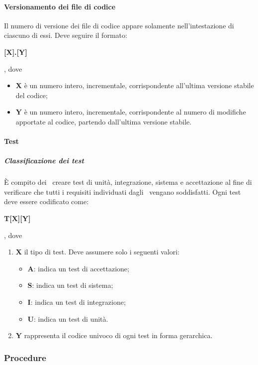 \documentclass[../NormeProgetto.tex]{subfiles}
\begin{document}
				\paragraph{Versionamento dei file di codice}
					Il numero di versione dei file di codice appare solamente nell'intestazione di ciascuno di essi. Deve seguire il formato:
					\begin{center}\textbf{[X].[Y]}\end{center}, dove
					\begin{itemize}
						\item \textbf{X} è un numero intero, incrementale, corrispondente all'ultima versione stabile del codice;
						\item \textbf{Y} è un numero intero, incrementale, corrispondente al numero di modifiche apportate al codice, partendo dall'ultima versione stabile.
					\end{itemize}
					
				\paragraph{Test}
					\subparagraph{Classificazione dei test}
					È compito dei \progettisti\ creare test di unità, integrazione, sistema e accettazione al fine di verificare che tutti i requisiti individuati dagli \analisti\ vengano soddisfatti. Ogni test deve essere codificato come:
					\begin{center}\textbf{T[X][Y]}\end{center}, dove
						\begin{enumerate}
							\item \textbf{X} il tipo di test. Deve assumere solo i seguenti valori:
							\begin{itemize}
								\item \textbf{A}: indica un test di accettazione;
								\item \textbf{S}: indica un test di sistema;
								\item \textbf{I}: indica un test di integrazione;
								\item \textbf{U}: indica un test di unità.
							\end{itemize}
							
							\item \textbf{Y} rappresenta il codice univoco di ogni test in forma gerarchica.
						\end{enumerate}
					
		\subsubsection{Procedure}
\end{document}
